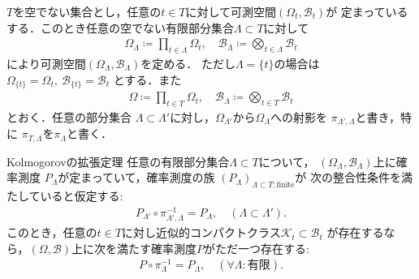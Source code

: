 	$T$を空でない集合とし，任意の$t \in T$に対して可測空間$(\Omega_t,\mathscr{B}_t)$が
	定まっているする．このとき任意の空でない有限部分集合$\Lambda \subset T$に対して
	\begin{align}
		\Omega_\Lambda \coloneqq \prod_{t \in \Lambda} \Omega_t,
		\quad \mathscr{B}_\Lambda \coloneqq \bigotimes_{t \in \Lambda} \mathscr{B}_t
	\end{align}
	により可測空間$(\Omega_\Lambda,\mathscr{B}_\Lambda)$を定める．
	ただし$\Lambda = \{t\}$の場合は$\Omega_{\{t\}} = \Omega_t,\ \mathscr{B}_{\{t\}} = \mathscr{B}_t$
	とする．また
	\begin{align}
		\Omega \coloneqq \prod_{t \in T} \Omega_t,
		\quad \mathscr{B}_\Lambda \coloneqq \bigotimes_{t \in T} \mathscr{B}_t
	\end{align}
	とおく．任意の部分集合
	$\Lambda \subset \Lambda'$に対し，$\Omega_{\Lambda'}$から$\Omega_{\Lambda}$への射影を
	$\pi_{\Lambda',\Lambda}$と書き，特に
	$\pi_{T,\Lambda}$を$\pi_{\Lambda}$と書く．
	
	\begin{itembox}[l]{Kolmogorovの拡張定理}
		任意の有限部分集合$\Lambda \subset T$について，
		$(\Omega_\Lambda,\mathscr{B}_\Lambda)$上に確率測度
		$P_\Lambda$が定まっていて，確率測度の族
		$(P_\Lambda)_{\Lambda \subset T:\mathrm{finite}}$が
		次の整合性条件を満たしていると仮定する:
		\begin{align}
			P_{\Lambda'} \circ \pi_{\Lambda',\Lambda}^{-1}
			= P_{\Lambda},
			\quad (\Lambda \subset \Lambda').
		\end{align}
		このとき，任意の$t \in T$に対し近似的コンパクトクラス$\mathcal{K}_t \subset \mathscr{B}_t$
		が存在するなら，$(\Omega,\mathscr{B})$上に次を満たす確率測度$P$がただ一つ存在する:
		\begin{align}
			P \circ \pi_{\Lambda}^{-1} = P_{\Lambda},
			\quad (\forall \Lambda:\mbox{有限}).
		\end{align}
	\end{itembox}
	

